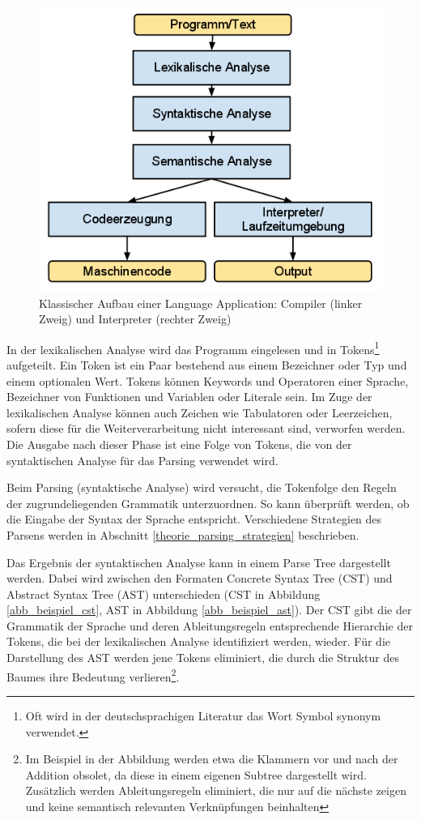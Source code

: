 \begin{figure}[h]
\includegraphics[width=\textwidth,scale=0.5]{figures/language_application_klassisch.png}
\caption{Klassischer Aufbau einer Language Application: Compiler (linker Zweig) und Interpreter (rechter Zweig)}
\label{abb_language_application_klassisch}
\end{figure}

In der lexikalischen Analyse wird das Programm eingelesen und in Tokens\footnote{Oft wird in der deutschsprachigen Literatur das Wort Symbol synonym verwendet.} aufgeteilt. Ein Token ist ein Paar bestehend aus einem Bezeichner oder Typ und einem optionalen Wert\cite[S. 111ff]{AhSe86}. Tokens können Keywords und Operatoren einer Sprache, Bezeichner von Funktionen und Variablen oder Literale sein. Im Zuge der lexikalischen Analyse können auch Zeichen wie Tabulatoren oder Leerzeichen, sofern diese für die Weiterverarbeitung nicht interessant sind, verworfen werden. Die Ausgabe nach dieser Phase ist eine Folge von Tokens, die von der syntaktischen Analyse für das Parsing verwendet wird.

Beim Parsing (syntaktische Analyse) wird versucht, die Tokenfolge den Regeln der zugrundeliegenden Grammatik unterzuordnen. So kann überprüft werden, ob die Eingabe der Syntax der Sprache entspricht. Verschiedene Strategien des Parsens werden in Abschnitt \ref{theorie_parsing_strategien} beschrieben. 

Das Ergebnis der syntaktischen Analyse kann in einem Parse Tree dargestellt werden. Dabei wird zwischen den Formaten Concrete Syntax Tree (CST) und Abstract Syntax Tree (AST) unterschieden (CST in Abbildung \ref{abb_beispiel_cst}, AST in Abbildung \ref{abb_beispiel_ast}). Der CST gibt die der Grammatik der Sprache und deren Ableitungsregeln ent\-sprech\-ende Hierarchie der Tokens, die bei der lexikalischen Analyse identifiziert werden, wieder. Für die Darstellung des AST werden jene Tokens eliminiert, die durch die Struktur des Baumes ihre Bedeutung verlieren\footnote{Im Beispiel in der Abbildung werden etwa die Klammern vor und nach der Addition obsolet, da diese in einem eigenen Subtree dargestellt wird. Zusätzlich werden Ableitungsregeln eliminiert, die nur auf die nächste zeigen und keine semantisch relevanten Verknüpfungen beinhalten}.  

